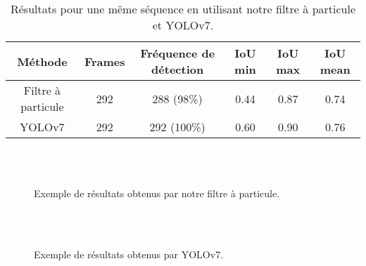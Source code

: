 \begin{table}[!htbp]
\begin{tabular}{|c|c|c|c|c|c|}
\hline
Méthode & Frames & Fréquence de détection & IoU min & IoU max & IoU mean\\
\hline
Filtre à particule & 292 & 288 (98\%) & 0.44 & 0.87 & 0.74\\
\hline
YOLOv7 & 292 & 292 (100\%) & 0.60 & 0.90 & 0.76\\
\hline
\end{tabular}
\caption{Résultats pour une même séquence en utilisant notre filtre à particule et YOLOv7.}
\label{tab:results}
\end{table}
\FloatBarrier

\begin{figure}[!htbp]
\center
	\hspace{0.1cm}
	\\
	\hspace{0.1cm}
	\\
	\hspace{0.1cm}
\caption{Exemple de résultats obtenus par notre filtre à particule.}
\label{fig:pf_results}
\end{figure}
\FloatBarrier

\begin{figure}[!htbp]
\center
	\hspace{0.1cm}
	\\
	\hspace{0.1cm}
	\\
	\hspace{0.1cm}
\caption{Exemple de résultats obtenus par YOLOv7.}
\label{fig:yolo_results}
\end{figure}
\FloatBarrier

